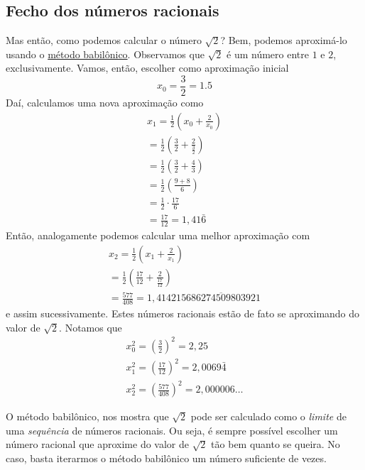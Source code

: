 \subsection{Fecho dos números racionais}

Mas então, como podemos calcular o número $\sqrt{2}$? Bem, podemos aproximá-lo usando o \href{https://en.wikipedia.org/wiki/Methods\_of\_computing\_square_roots#Babylonian\_method}{método babilônico}. Observamos que $\sqrt{2}$ é um número entre $1$ e $2$, exclusivamente. Vamos, então, escolher como aproximação inicial
\begin{equation}
  x_0 = \frac{3}{2} = 1.5
\end{equation}
Daí, calculamos uma nova aproximação como
\begin{gather}
  x_1 = \frac{1}{2}\left(x_0 + \frac{2}{x_0}\right) \\
  = \frac{1}{2}\left(\frac{3}{2} + \frac{2}{\frac{3}{2}}\right) \\
  = \frac{1}{2}\left(\frac{3}{2} + \frac{4}{3}\right) \\
  = \frac{1}{2}\left(\frac{9+8}{6}\right)\\
  = \frac{1}{2}\cdot\frac{17}{6} \\
  = \frac{17}{12} = 1,41\bar{6}
\end{gather}
Então, analogamente podemos calcular uma melhor aproximação com
\begin{gather}
  x_2 = \frac{1}{2}\left(x_1 + \frac{2}{x_1}\right) \\
  = \frac{1}{2}\left(\frac{17}{12} + \frac{2}{\frac{17}{12}}\right) \\
  = \frac{577}{408} = 1,41421\overline{5686274509803921}
\end{gather}
e assim sucessivamente. Estes números racionais estão de fato se aproximando do valor de $\sqrt{2}$. Notamos que
\begin{gather}
  x_0^2 = \left(\frac{3}{2}\right)^2 = 2,25\\
  x_1^2 = \left(\frac{17}{12}\right)^2 = 2,0069\bar{4} \\
  x_2^2 = \left(\frac{577}{408}\right)^2 = 2,000006\ldots
\end{gather}

O método babilônico, nos mostra que $\sqrt{2}$ pode ser calculado como o \emph{limite} de uma \emph{sequência} de números racionais. Ou seja, é sempre possível escolher um número racional que aproxime do valor de $\sqrt{2}$ tão bem quanto se queira. No caso, basta iterarmos o método babilônico um número suficiente de vezes.

